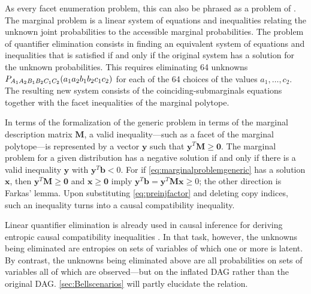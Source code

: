 {As every facet enumeration problem, this can also be phrased as a problem of . 
The marginal problem is a linear system of equations and inequalities relating the unknown joint probabilities to the accessible marginal probabilities. The problem of quantifier elimination consists in finding an equivalent system of equations and inequalities that is satisfied if and only if the original system has a solution for the unknown probabilities. This requires eliminating 64 unknowns $\p[A_1 A_2 B_1 B_2 C_1 C_2]{a_1 a_2 b_1 b_2 c_1 c_2}$ for each of the 64 choices of the values $a_1,\ldots,c_2$. The resulting new system consists of the coinciding-submarginals equations together with the facet inequalities of the marginal polytope.


\color{blue} In terms of the formalization of the generic problem in terms of the marginal description matrix $\bm{M}$,\color{black} 
a valid inequality---such as a facet of the marginal polytope---is represented by a vector $\bm{y}$ such that $\bm{y}^T\bm{M}\geq\bm{0}$. The marginal problem for a given distribution has a negative solution if and only if there is a valid inequality $\bm{y}$ with $\bm{y}^T\bm{b} < 0$. For if \cref{eq:marginalproblemgeneric} has a solution $\bm{x}$, then $\bm{y}^T\bm{M}\geq \bm{0}$ and $\bm{x}\geq \bm{0}$ imply $\bm{y}^T\bm{b} = \bm{y}^T\bm{M}\bm{x} \geq 0$; the other direction is Farkas' lemma. Upon substituting \cref{eq:preinjfactor} and deleting copy indices, such an inequality turns into a causal compatibility inequality.

Linear quantifier elimination is already used in causal inference for deriving entropic causal compatibility inequalities \cite{chaves2014novel,chaves2014informationinference}. In that task, however, the unknowns being eliminated are entropies on sets of variables of which one or more is latent. By contrast, the unknowns being eliminated above are all probabilities on sets of variables all of which are observed---but on the inflated DAG rather than the original DAG.
\cref{sec:Bellscenarios} will partly elucidate the relation.

}
